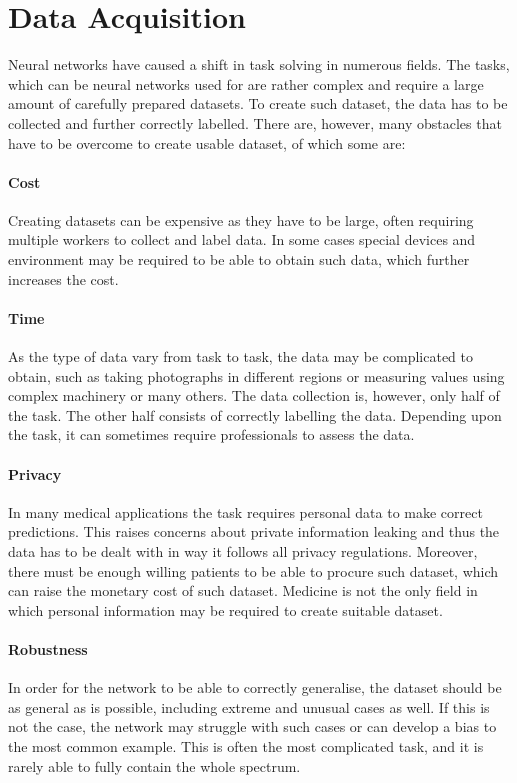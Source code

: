 \section{Data Acquisition}
Neural networks have caused a shift in task solving in numerous fields. The tasks, which can be neural networks used for are rather complex and require a large amount of carefully prepared datasets. To create such dataset, the data has to be collected and further correctly labelled. There are, however, many obstacles that have to be overcome to create usable dataset, of which some are:

\paragraph{Cost} Creating datasets can be expensive as they have to be large, often requiring multiple workers to collect and label data. In some cases special devices and environment may be required to be able to obtain such data, which further increases the cost.
\paragraph{Time} As the type of data vary from task to task, the data may be complicated to obtain, such as taking photographs in different regions or measuring values using complex machinery or many others. The data collection is, however, only half of the task. The other half consists of correctly labelling the data. Depending upon the task, it can sometimes require professionals to assess the data.
\paragraph{Privacy} In many medical applications the task requires personal data to make correct predictions. This raises concerns about private information leaking and thus the data has to be dealt with in way it follows all privacy regulations. Moreover, there must be enough willing patients to be able to procure such dataset, which can raise the monetary cost of such dataset. Medicine is not the only field in which personal information may be required to create suitable dataset.
\paragraph{Robustness} In order for the network to be able to correctly generalise, the dataset should be as general as is possible, including extreme and unusual cases as well. If this is not the case, the network may struggle with such cases or can develop a bias to the most common example. This is often the most complicated task, and it is rarely able to fully contain the whole spectrum.
